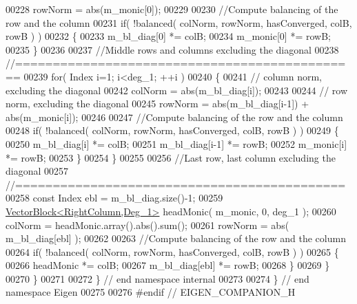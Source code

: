 \begin{DoxyCode}
00228     rowNorm = abs(m\_monic[0]);
00229 
00230     \textcolor{comment}{//Compute balancing of the row and the column}
00231     \textcolor{keywordflow}{if}( !balanced( colNorm, rowNorm, hasConverged, colB, rowB ) )
00232     \{
00233       m\_bl\_diag[0] *= colB;
00234       m\_monic[0] *= rowB;
00235     \}
00236 
00237     \textcolor{comment}{//Middle rows and columns excluding the diagonal}
00238     \textcolor{comment}{//==============================================}
00239     \textcolor{keywordflow}{for}( Index i=1; i<deg\_1; ++i )
00240     \{
00241       \textcolor{comment}{// column norm, excluding the diagonal}
00242       colNorm = abs(m\_bl\_diag[i]);
00243 
00244       \textcolor{comment}{// row norm, excluding the diagonal}
00245       rowNorm = abs(m\_bl\_diag[i-1]) + abs(m\_monic[i]);
00246 
00247       \textcolor{comment}{//Compute balancing of the row and the column}
00248       \textcolor{keywordflow}{if}( !balanced( colNorm, rowNorm, hasConverged, colB, rowB ) )
00249       \{
00250         m\_bl\_diag[i]   *= colB;
00251         m\_bl\_diag[i-1] *= rowB;
00252         m\_monic[i]     *= rowB;
00253       \}
00254     \}
00255 
00256     \textcolor{comment}{//Last row, last column excluding the diagonal}
00257     \textcolor{comment}{//============================================}
00258     \textcolor{keyword}{const} Index ebl = m\_bl\_diag.size()-1;
00259     \hyperlink{group___core___module_class_eigen_1_1_vector_block}{VectorBlock<RightColumn,Deg\_1>} headMonic( m\_monic, 0, deg\_1 );
00260     colNorm = headMonic.array().abs().sum();
00261     rowNorm = abs( m\_bl\_diag[ebl] );
00262 
00263     \textcolor{comment}{//Compute balancing of the row and the column}
00264     \textcolor{keywordflow}{if}( !balanced( colNorm, rowNorm, hasConverged, colB, rowB ) )
00265     \{
00266       headMonic      *= colB;
00267       m\_bl\_diag[ebl] *= rowB;
00268     \}
00269   \}
00270 \}
00271 
00272 \} \textcolor{comment}{// end namespace internal}
00273 
00274 \} \textcolor{comment}{// end namespace Eigen}
00275 
00276 \textcolor{preprocessor}{#endif // EIGEN\_COMPANION\_H}
\end{DoxyCode}
